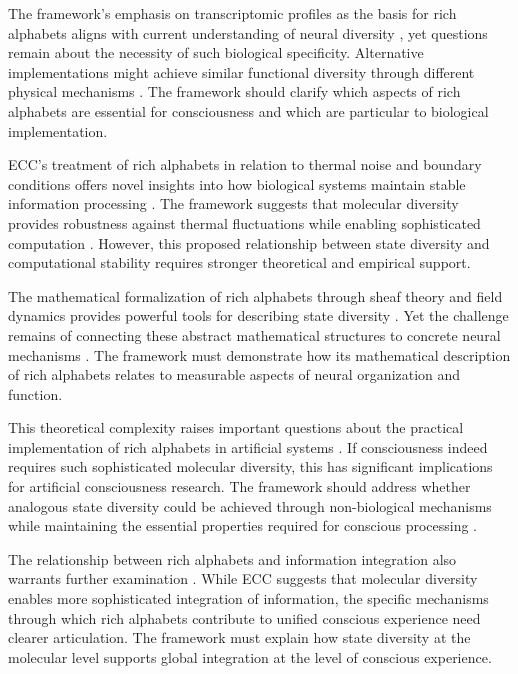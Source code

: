 The framework's emphasis on transcriptomic profiles as the basis for rich alphabets aligns with current understanding of neural diversity \cite{rovelli2018order}, yet questions remain about the necessity of such biological specificity. Alternative implementations might achieve similar functional diversity through different physical mechanisms \cite{penrose2016fashion}. The framework should clarify which aspects of rich alphabets are essential for consciousness and which are particular to biological implementation.

ECC's treatment of rich alphabets in relation to thermal noise and boundary conditions offers novel insights into how biological systems maintain stable information processing \cite{rosen2012anticipatory}. The framework suggests that molecular diversity provides robustness against thermal fluctuations while enabling sophisticated computation \cite{thompson2014waking}. However, this proposed relationship between state diversity and computational stability requires stronger theoretical and empirical support.

The mathematical formalization of rich alphabets through sheaf theory and field dynamics provides powerful tools for describing state diversity \cite{langer2009philosophy}. Yet the challenge remains of connecting these abstract mathematical structures to concrete neural mechanisms \cite{varela2016embodied}. The framework must demonstrate how its mathematical description of rich alphabets relates to measurable aspects of neural organization and function.

This theoretical complexity raises important questions about the practical implementation of rich alphabets in artificial systems \cite{feinberg2016ancient}. If consciousness indeed requires such sophisticated molecular diversity, this has significant implications for artificial consciousness research. The framework should address whether analogous state diversity could be achieved through non-biological mechanisms while maintaining the essential properties required for conscious processing \cite{zahavi2014self}.

The relationship between rich alphabets and information integration also warrants further examination \cite{merleau2012phenomenology}. While ECC suggests that molecular diversity enables more sophisticated integration of information, the specific mechanisms through which rich alphabets contribute to unified conscious experience need clearer articulation. The framework must explain how state diversity at the molecular level supports global integration at the level of conscious experience.

